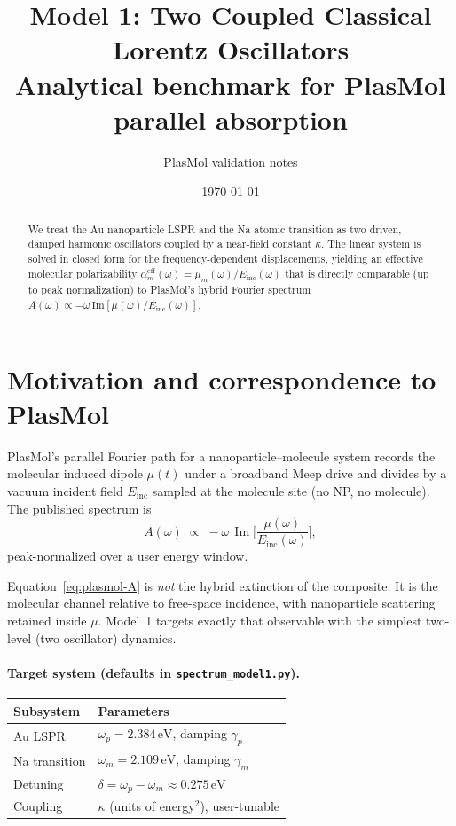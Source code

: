 \documentclass[11pt,a4paper]{article}
\title{Model 1: Two Coupled Classical Lorentz Oscillators\\
\large Analytical benchmark for PlasMol parallel absorption}
\author{PlasMol validation notes}
\date{\today}
\begin{document}
\maketitle

\begin{abstract}
\noindent
We treat the Au nanoparticle LSPR and the Na atomic transition as two
driven, damped harmonic oscillators coupled by a near-field constant
$\kappa$.  The linear system is solved in closed form for the
frequency-dependent displacements, yielding an effective molecular
polarizability $\alpha_m^{\mathrm{eff}}(\omega)=\mu_m(\omega)/E_{\mathrm{inc}}(\omega)$
that is directly comparable (up to peak normalization) to PlasMol's
hybrid Fourier spectrum
$A(\omega)\propto-\omega\,\mathrm{Im}[\mu(\omega)/E_{\mathrm{inc}}(\omega)]$.
\end{abstract}

\tableofcontents
\newpage

\section{Motivation and correspondence to PlasMol}

PlasMol's parallel Fourier path for a nanoparticle--molecule system
records the molecular induced dipole $\mu(t)$ under a broadband Meep
drive and divides by a vacuum incident field $E_{\mathrm{inc}}$ sampled
at the molecule site (no NP, no molecule).  The published spectrum is
\begin{equation}
  A(\omega)
  \;\propto\;
  -\omega\,
  \operatorname{Im}\!
  \Big[
    \frac{\mu(\omega)}{E_{\mathrm{inc}}(\omega)}
  \Big],
  \label{eq:plasmol-A}
\end{equation}
peak-normalized over a user energy window.

Equation~\eqref{eq:plasmol-A} is \emph{not} the hybrid extinction of the
composite.  It is the molecular channel relative to free-space
incidence, with nanoparticle scattering retained inside $\mu$.  Model~1
targets exactly that observable with the simplest two-level (two
oscillator) dynamics.

\paragraph{Target system (defaults in \texttt{spectrum\_model1.py}).}
\begin{center}
\begin{tabular}{@{}ll@{}}
\toprule
Subsystem & Parameters \\
\midrule
Au LSPR & $\omega_p = 2.384\,\mathrm{eV}$, damping $\gamma_p$ \\
Na transition & $\omega_m = 2.109\,\mathrm{eV}$, damping $\gamma_m$ \\
Detuning & $\delta = \omega_p - \omega_m \approx 0.275\,\mathrm{eV}$ \\
Coupling & $\kappa$ (units of energy$^2$), user-tunable \\
\bottomrule
\end{tabular}
\end{center}
\end{document}
